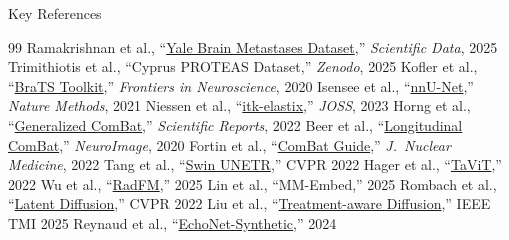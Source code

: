 \documentclass[aspectratio=169,xcolor=dvipsnames]{beamer}
\begin{document}
\begin{frame}[allowframebreaks]{Key References}
    \scriptsize
    \begin{thebibliography}{99}
         Ramakrishnan et al., ``\href{https://doi.org/10.1038/s41597-025-04360-7}{Yale Brain Metastases Dataset},'' \textit{Scientific Data}, 2025
         Trimithiotis et al., ``Cyprus PROTEAS Dataset,'' \textit{Zenodo}, 2025
         Kofler et al., ``\href{https://doi.org/10.3389/fnins.2020.00125}{BraTS Toolkit},'' \textit{Frontiers in Neuroscience}, 2020
         Isensee et al., ``\href{https://doi.org/10.1038/s41592-020-01008-z}{nnU-Net},'' \textit{Nature Methods}, 2021
         Niessen et al., ``\href{https://doi.org/10.21105/joss.05421}{itk-elastix},'' \textit{JOSS}, 2023
         Horng et al., ``\href{https://doi.org/10.1038/s41598-022-08412-9}{Generalized ComBat},'' \textit{Scientific Reports}, 2022
         Beer et al., ``\href{https://doi.org/10.1016/j.neuroimage.2020.117129}{Longitudinal ComBat},'' \textit{NeuroImage}, 2020
         Fortin et al., ``\href{https://doi.org/10.2967/jnumed.121.262464}{ComBat Guide},'' \textit{J.\ Nuclear Medicine}, 2022
         Tang et al., ``\href{https://arxiv.org/abs/2201.01266}{Swin UNETR},'' CVPR 2022
         Hager et al., ``\href{https://arxiv.org/abs/2207.01032}{TaViT},'' 2022
         Wu et al., ``\href{https://arxiv.org/abs/2308.02463}{RadFM},'' 2025
         Lin et al., ``MM-Embed,'' 2025
         Rombach et al., ``\href{https://arxiv.org/abs/2112.10752}{Latent Diffusion},'' CVPR 2022
         Liu et al., ``\href{https://arxiv.org/abs/2309.05406}{Treatment-aware Diffusion},'' IEEE TMI 2025
         Reynaud et al., ``\href{https://arxiv.org/abs/2309.00997}{EchoNet-Synthetic},'' 2024
    \end{thebibliography}
\end{frame}
\end{document}
